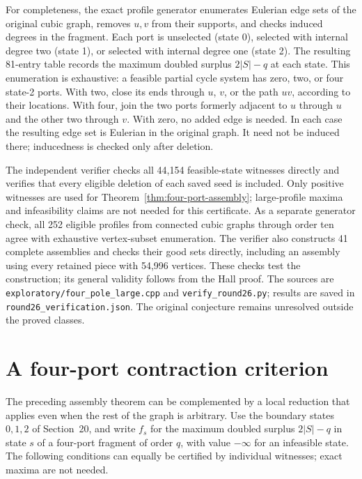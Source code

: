 \documentclass[11pt]{article}
\begin{document}
For completeness, the exact profile generator enumerates Eulerian
edge sets of the original cubic graph, removes $u,v$ from their
supports, and checks induced degrees in the fragment. Each port is
unselected (state 0), selected with internal degree two (state 1), or
selected with internal degree one (state 2). The resulting 81-entry
table records the maximum doubled surplus $2|S|-q$ at each state.
This enumeration is exhaustive: a feasible partial cycle system has
zero, two, or four state-2 ports. With two, close its ends through
$u$, $v$, or the path $uv$, according to their locations. With four,
join the two ports formerly adjacent to $u$ through $u$ and the other
two through $v$. With zero, no added edge is needed. In each case
the resulting edge set is Eulerian in the original graph. It need
not be induced there; inducedness is checked only after deletion.

The independent verifier checks all 44,154 feasible-state witnesses
directly and verifies that every eligible deletion of each saved seed
is included. Only positive witnesses are used for
Theorem~\ref{thm:four-port-assembly}; large-profile maxima and
infeasibility claims are not needed for this certificate. As a separate
generator check, all 252 eligible profiles from connected cubic graphs
through order ten agree with exhaustive vertex-subset enumeration.
The verifier also constructs 41 complete assemblies and checks their
good sets directly, including an assembly using every retained piece
with 54,996 vertices. These checks test the construction; its general
validity follows from the Hall proof.
The sources are \texttt{exploratory/four\_pole\_large.cpp} and
\texttt{verify\_round26.py}; results are saved in
\texttt{round26\_verification.json}. The original conjecture remains
unresolved outside the proved classes.

\section{A four-port contraction criterion}
The preceding assembly theorem can be complemented by a local
reduction that applies even when the rest of the graph is arbitrary.
Use the boundary states $0,1,2$ of Section~20, and write $f_s$ for
the maximum doubled surplus $2|S|-q$ in state $s$ of a four-port
fragment of order $q$, with value $-\infty$ for an infeasible state.
The following conditions can equally be certified by individual
witnesses; exact maxima are not needed.
\end{document}
